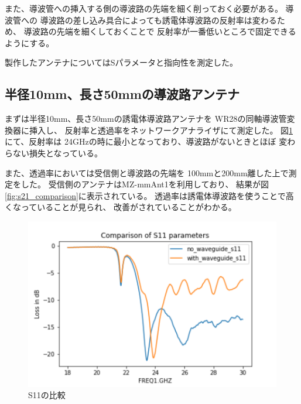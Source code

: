 \documentclass[technicalreport]{ieicej}
\begin{document}
また、導波管への挿入する側の導波路の先端を細く削っておく必要がある。
導波管への
導波路の差し込み具合によっても誘電体導波路の反射率は変わるため、
導波路の先端を細くしておくことで
反射率が一番低いところで固定できるようにする。

製作したアンテナについてはSパラメータと指向性を測定した。

\subsection{半径10mm、長さ50mmの導波路アンテナ}

まずは半径10mm、長さ50mmの誘電体導波路アンテナを
WR28の同軸導波管変換器に挿入し、
反射率と透過率をネットワークアナライザにて測定した。
図\ref{fig:s11_comparison}にて、反射率は
24GHzの時に最小となっており、導波路がないときとほぼ
変わらない損失となっている。

また、透過率においては受信側と導波路の先端を
100mmと200mm離した上で測定をした。
受信側のアンテナはMZ-mmAnt1を利用しており、
結果が図\ref{fig:s21_comparison}に表示されている。
透過率は誘電体導波路を使うことで高くなっていることが見られ、
改善がされていることがわかる。

\begin{figure}[tb]
  \begin{center}
    \includegraphics[bb=0 0 432.098422 288.065615, width=1.0\linewidth]{img/s11_comparison.pdf}
    \caption{S11の比較}
    \label{fig:s11_comparison}
  \end{center}
\end{figure}
\end{document}
